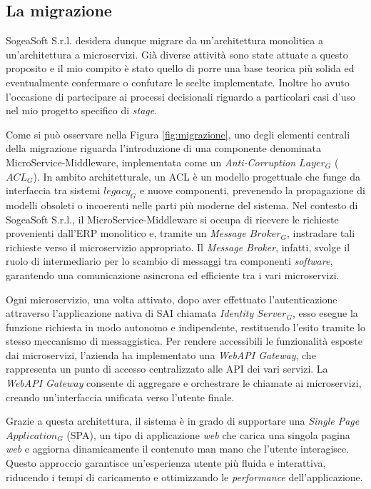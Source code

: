         \subsection{La migrazione}
        SogeaSoft S.r.l. desidera dunque migrare da un'architettura monolitica a un'architettura a microservizi. Già diverse attività sono state attuate a questo proposito e il mio compito è stato quello di porre una base teorica più solida ed eventualmente confermare o confutare le scelte implementate. Inoltre ho avuto l'occasione di partecipare ai processi decisionali riguardo a particolari casi d'uso nel mio progetto specifico di \textit{stage}. 

        \vspace{0.2 em}
        \noindent Come si può osservare nella Figura \ref{fig:migrazione}, uno degli elementi centrali della migrazione riguarda l'introduzione di una componente denominata MicroService-Middleware, implementata come un \textit{Anti-Corruption $Layer_G$} ($ACL_G$). In ambito architetturale, un ACL è un modello progettuale che funge da interfaccia tra sistemi $legacy_G$ e nuove componenti, prevenendo la propagazione di modelli obsoleti o incoerenti nelle parti più moderne del sistema. Nel contesto di SogeaSoft S.r.l., il MicroService-Middleware si occupa di ricevere le richieste provenienti dall'ERP monolitico e, tramite un \textit{Message $Broker_G$}, instradare tali richieste verso il microservizio appropriato. Il \textit{Message Broker}, infatti, svolge il ruolo di intermediario per lo scambio di messaggi tra componenti \textit{software}, garantendo una comunicazione asincrona ed efficiente tra i vari microservizi.  

        \vspace{0.2 em}
        \noindent Ogni microservizio, una volta attivato, dopo aver effettuato l'autenticazione attraverso l'applicazione nativa di SAI chiamata \textit{Identity $Server_G$}, esso esegue la funzione richiesta in modo autonomo e indipendente, restituendo l’esito tramite lo stesso meccanismo di messaggistica. Per rendere accessibili le funzionalità esposte dai microservizi, l'azienda ha implementato una \textit{WebAPI Gateway}, che rappresenta un punto di accesso centralizzato alle API dei vari servizi. La \textit{WebAPI Gateway} consente di aggregare e orchestrare le chiamate ai microservizi, creando un'interfaccia unificata verso l'utente finale.  

        \vspace{0.2 em}
        \noindent Grazie a questa architettura, il sistema è in grado di supportare una \textit{Single Page $Application_G$} (SPA), un tipo di applicazione \textit{web} che carica una singola pagina \textit{web} e aggiorna dinamicamente il contenuto man mano che l'utente interagisce. Questo approccio garantisce un'esperienza utente più fluida e interattiva, riducendo i tempi di caricamento e ottimizzando le \textit{performance} dell'applicazione.  

